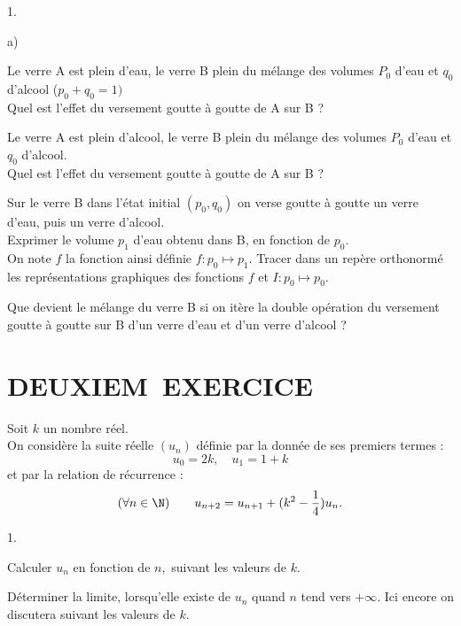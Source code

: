 \documentclass[11pt]{article}%
\begin{document}
\begin{noliste}{1.}
\item 

\begin{noliste}{a)}
 \setlength{\itemsep}{2mm}
\item Le verre A est plein d'eau, le verre B plein du mélange des
volumes $P_{0}$ d'eau et $q_{0}$ d'alcool ($p_{0} + q_{0} = 1)$\\
Quel est l'effet du versement goutte à goutte de A sur B ?

\item Le verre A est plein d'alcool, le verre B plein du mélange des
volumes 
$P_{0}$ d'eau et $q_{0}$ d'alcool.\\
Quel est l'effet du versement goutte à goutte de A sur B ?

\item Sur le verre B dans l'état initial $(p_{0},q_{0})$ on verse
goutte à
goutte un verre d'eau, puis un verre d'alcool.\\
Exprimer le volume $p_{1}$ d'eau obtenu dans B, en fonction de
$p_{0}.$\\
On note $f$ la fonction ainsi définie $f :p_{0}\mapsto p_{1}.$ Tracer
dans un
repère orthonormé les représentations graphiques des fonctions $f$ et
$I :p_{0}\mapsto p_{0}.$

\item Que devient le mélange du verre B si on itère la double opération
du
versement goutte à goutte sur B d'un verre d'eau et d'un verre d'alcool
?
\end{noliste}
\end{noliste}

\section*{DEUXIEM\E\ EXERCICE}

Soit $k$ un nombre réel.\\
On considère la suite réelle $(u_{n})$ définie par la donnée de ses
premiers
termes :
\[
u_{0} = 2k,\quad u_{1} = 1 + k
\]
et par la relation de récurrence :
\[
(\forall n\in \N)\qquad u_{n + 2} = u_{n + 1} +
(k^{2}-\dfrac{1}{4})u_{n}.
\]

\begin{noliste}{1.}
 \setlength{\itemsep}{4mm}
\item Calculer $u_{n}$ en fonction de $n,$ suivant les valeurs de $k.$

\item Déterminer la limite, lorsqu'elle existe de $u_{n}$ quand $n$
tend
vers $ + \infty.$ Ici encore on discutera suivant les valeurs de $k.$
\end{noliste}
\end{document}
